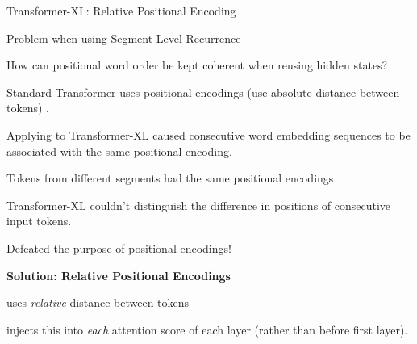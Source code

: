 \begin{frame}{Transformer-XL: Relative Positional Encoding}
    \normalsize\linespread{1.0}

    \begin{alertBlock}{Problem when using Segment-Level Recurrence}
    
        How can positional word order be kept coherent when reusing hidden states?
        
        Standard Transformer uses positional encodings (use absolute distance between tokens) .
    
        \begin{addmargin}{3em}{} %
        \begin{itemizeSpaced}{5pt}
            \largearrowitem Applying to Transformer-XL caused consecutive word embedding sequences to be associated with the same positional encoding.
            
            \largearrowitem Tokens from different segments had the same positional encodings
            
            \largearrowitem Transformer-XL couldn't distinguish the difference in positions of consecutive input tokens.
            
            \largearrowitem Defeated the purpose of positional encodings!
            
        \end{itemizeSpaced}
        \end{addmargin} 
        
        
    \end{alertBlock} 
    
    {\large \textbf{Solution: Relative Positional Encodings}}
    
    \begin{itemizeSpaced}{0pt}
        \item uses \emph{relative} distance between tokens 
        
        \item injects this into \emph{each} attention score of each layer (rather than before first layer).
    \end{itemizeSpaced}

    
\end{frame}



